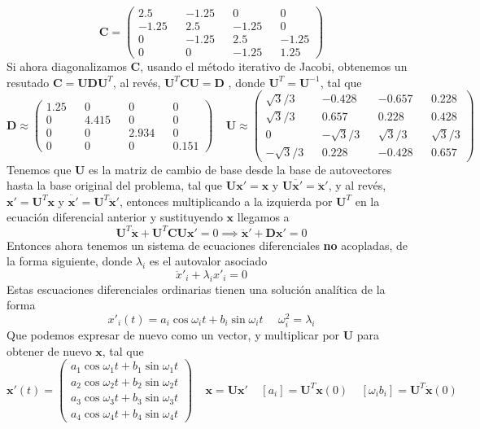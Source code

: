 \documentclass{article}
\begin{document}
\[\mathbf{C} = \left(\begin{matrix}
	2.5 && -1.25 &&  0 &&  0 \\
   -1.25 &&  2.5 && -1.25 &&  0 \\
	0 && -1.25 &&  2.5 && -1.25 \\
	0 &&  0 && -1.25 && 1.25
\end{matrix}\right)\]
Si ahora diagonalizamos $\mathbf{C}$, usando el método iterativo de Jacobi, obtenemos un resutado $\mathbf{C} = \mathbf{U}\mathbf{D}\mathbf{U}^T$, al revés, $\mathbf{U}^T \mathbf{C}\mathbf{U} = \mathbf{D}$ , donde $\mathbf{U}^T = \mathbf{U}^{-1}$, tal que
\[\mathbf{D} \approx \left(\begin{matrix}
	1.25 && 0 &&  0 &&  0 \\
    0 &&  4.415 && 0&&  0 \\
	0 && 0 &&  2.934 && 0 \\
	0 &&  0 && 0&& 0.151
\end{matrix}\right) \ \ \ \ \ \mathbf{U} \approx \left(\begin{matrix}
	\sqrt{3}/3 && -0.428 &&  -0.657 &&  0.228 \\
    \sqrt{3}/3 &&  0.657 &&  0.228  &&  0.428 \\
	0 && -\sqrt{3}/3 &&  \sqrt{3}/3 && \sqrt{3}/3 \\
	-\sqrt{3}/3 &&  0.228 && -0.428&& 0.657
\end{matrix}\right)\]
Tenemos que $\mathbf{U}$ es la matriz de cambio de base desde la base de autovectores hasta la base original del problema, tal que $\mathbf{U} \mathbf{x}' = \mathbf{x}$ y $\mathbf{U} \ddot{\mathbf{x'}} = \ddot{\mathbf{x}}'$, y al revés, $ \mathbf{x}' =\mathbf{U}^T \mathbf{x}$ y $\ddot{\mathbf{x'}} = \mathbf{U}^T \ddot{\mathbf{x}}'$, entonces multiplicando a la izquierda por $\mathbf{U}^T$ en la ecuación diferencial anterior y sustituyendo $\mathbf{x}$ llegamos a 
\[\mathbf{U}^T\ddot{\mathbf{x}} + \mathbf{U}^T\mathbf{C} \mathbf{U}\mathbf{x}' = 0 \implies \ddot{\mathbf{x}}' + \mathbf{D} \mathbf{x}'=0\]
Entonces ahora tenemos un sistema de ecuaciones diferenciales \textbf{no} acopladas, de la forma siguiente, donde $\lambda_i$ es el autovalor asociado
\[\ddot{x}'_i + \lambda_i x'_i =0\]
Estas escuaciones diferenciales ordinarias tienen una solución analítica de la forma
\[x'_i(t) = a_i \cos\omega_i t + b_i \sin\omega_i t \ \ \ \ \ \ \omega_i^2 = \lambda_i\]
Que podemos expresar de nuevo como un vector, y multiplicar por $\mathbf{U}$ para obtener de nuevo $\mathbf{x}$, tal que
\[\mathbf{x}'(t) = \left(\begin{matrix}
	a_1 \cos\omega_1 t + b_1 \sin\omega_1 t \\
	a_2 \cos\omega_2 t + b_2 \sin\omega_2 t \\
	a_3 \cos\omega_3 t + b_3 \sin\omega_3 t \\
	a_4 \cos\omega_4 t + b_4 \sin\omega_4 t
\end{matrix}\right) \ \ \ \ \ \mathbf{x} = \mathbf{U} \mathbf{x}' \ \ \ \ \  [a_i] = \mathbf{U}^T \mathbf{x}(0) \ \ \ \ \  [\omega_i b_i] = \mathbf{U}^T \dot{\mathbf{x}}(0)\]
\end{document}
